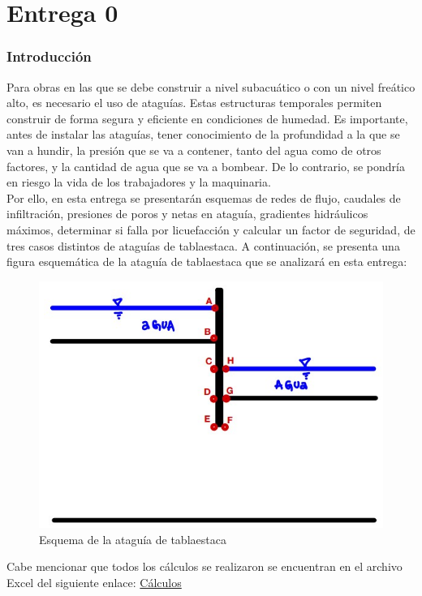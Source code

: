 \documentclass{article}
\begin{document}
\part{Entrega 0}
\section{Introducción}
Para obras en las que se debe construir a nivel subacuático o con un nivel freático alto, es necesario el uso de ataguías. Estas estructuras temporales permiten construir de forma segura y eficiente en condiciones de humedad. Es importante, antes de instalar las ataguías, tener conocimiento de la profundidad a la que se van a hundir, la presión que se va a contener, tanto del agua como de otros factores, y la cantidad de agua que se va a bombear. De lo contrario, se pondría en riesgo la vida de los trabajadores y la maquinaria. \\

Por ello, en esta entrega se presentarán esquemas de redes de flujo, caudales de infiltración, presiones de poros y netas en ataguía, gradientes hidráulicos máximos, determinar si falla por licuefacción y calcular un factor de seguridad, de tres casos distintos de ataguías de tablaestaca. A continuación, se presenta una figura esquemática de la ataguía de tablaestaca que se analizará en esta entrega:

\begin{figure}[h!]
  \centering
  \includegraphics[width=0.8\linewidth]{graficos/puntos_interes.png}
  \caption{Esquema de la ataguía de tablaestaca}
  \label{fig:enunciado}
\end{figure}

Cabe mencionar que todos los cálculos se realizaron se encuentran en el archivo Excel del siguiente enlace: \href{https://github.com/berckanala/Proyecto-1-MCOC/tree/main/Codigos_calculos}{Cálculos}
\end{document}

